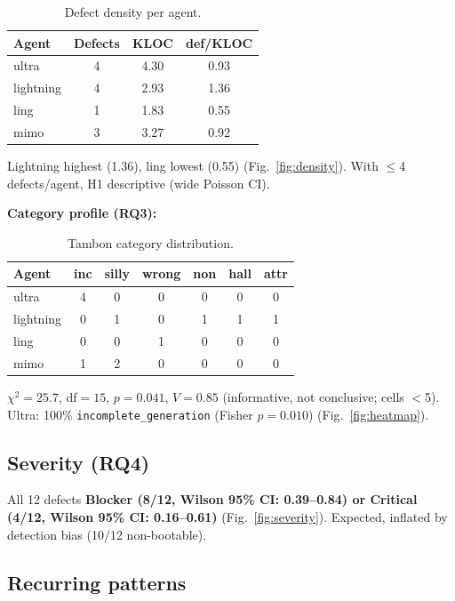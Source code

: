 \documentclass[10pt,twocolumn]{article}
\begin{document}
\begin{table}[t]
\caption{Defect density per agent.}
\label{tab:density}
\small
\begin{tabularx}{\columnwidth}{@{}l c c c@{}}
\toprule
\textbf{Agent} & \textbf{Defects} & \textbf{KLOC} & \textbf{def/KLOC}\\
\midrule
ultra & 4 & 4.30 & 0.93\\
lightning & 4 & 2.93 & 1.36\\
ling & 1 & 1.83 & 0.55\\
mimo & 3 & 3.27 & 0.92\\
\bottomrule
\end{tabularx}
\end{table}

Lightning highest (1.36), ling lowest (0.55) (Fig.~\ref{fig:density}). With $\le$4 defects/agent, H1 descriptive (wide Poisson CI).

\textbf{Category profile (RQ3):}

\begin{table}[t]
\caption{Tambon category distribution.}
\label{tab:category}
\small
\begin{tabularx}{\columnwidth}{@{}l c c c c c c@{}}
\toprule
\textbf{Agent} & \textbf{inc} & \textbf{silly} & \textbf{wrong} & \textbf{non} & \textbf{hall} & \textbf{attr}\\
\midrule
ultra & 4 & 0 & 0 & 0 & 0 & 0\\
lightning & 0 & 1 & 0 & 1 & 1 & 1\\
ling & 0 & 0 & 1 & 0 & 0 & 0\\
mimo & 1 & 2 & 0 & 0 & 0 & 0\\
\bottomrule
\end{tabularx}
\end{table}

$\chi^2=25.7$, df$=15$, $p=0.041$, $V=0.85$ (informative, not conclusive; cells $<$5). Ultra: 100\% \texttt{incomplete\_generation} (Fisher $p=0.010$) (Fig.~\ref{fig:heatmap}).

\subsection{Severity (RQ4)}

All 12 defects \textbf{Blocker (8/12, Wilson 95\% CI: 0.39--0.84) or Critical (4/12, Wilson 95\% CI: 0.16--0.61)} (Fig.~\ref{fig:severity}). Expected, inflated by detection bias (10/12 non-bootable).

\subsection{Recurring patterns}
\end{document}
